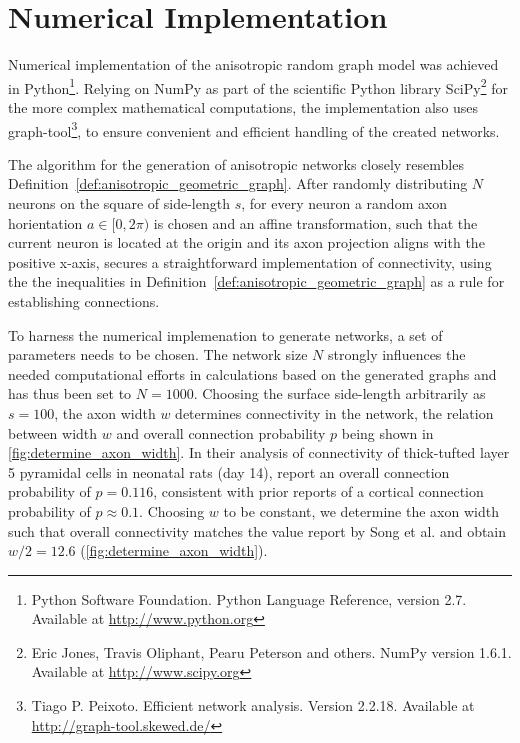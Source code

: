 



\section{Numerical Implementation}\label{sec:numerical_implementation}

Numerical implementation of the anisotropic random graph model was
achieved in Python\footnote{Python Software Foundation. Python
  Language Reference, version 2.7. Available at
  \url{http://www.python.org}}. Relying on NumPy as part of the
scientific Python library SciPy\footnote{Eric Jones, Travis Oliphant,
  Pearu Peterson and others. NumPy version 1.6.1. Available at
  \url{http://www.scipy.org}} for the more complex mathematical
computations, the implementation also uses graph-tool\footnote{Tiago
  P. Peixoto. Efficient network analysis. Version 2.2.18. Available at
  \url{http://graph-tool.skewed.de/}}, to ensure convenient and
efficient handling of the created networks.

The algorithm for the generation of anisotropic networks closely
resembles Definition~\ref{def:anisotropic_geometric_graph}. After
randomly distributing $N$ neurons on the square of side-length $s$,
for every neuron a random axon horientation $a \in [0,2\pi)$ is chosen
and an affine transformation, such that the current neuron is located
at the origin and its axon projection aligns with the positive x-axis,
secures a straightforward implementation of connectivity, using the
the inequalities in Definition~\ref{def:anisotropic_geometric_graph}
as a rule for establishing connections.

To harness the numerical implemenation to generate networks, a set of
parameters needs to be chosen. The network size $N$ strongly
influences the needed computational efforts in calculations based on
the generated graphs and has thus been set to $N = 1000$. 
Choosing the surface side-length arbitrarily as $s=100$, the axon
width $w$ determines connectivity in the network, the relation between
width $w$ and overall connection probability $p$ being shown in
\autoref{fig:determine_axon_width}.  In their analysis of connectivity
of thick-tufted layer 5 pyramidal cells in neonatal rats (day 14),
\textcite{Song2005} report an overall connection probability of
$p=0.116$, consistent with prior reports of a cortical connection
probability of $p \approx 0.1$. Choosing $w$ to be constant, we
determine the axon width such that overall connectivity matches the
value report by Song et al. and obtain $w/2 = 12.6$
(\autoref{fig:determine_axon_width}).


